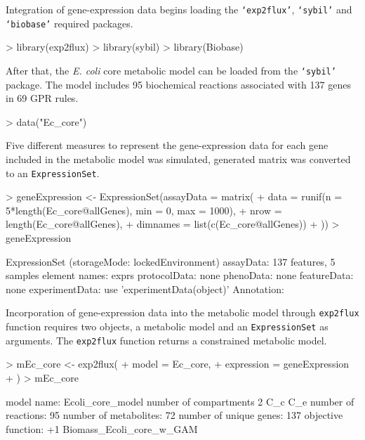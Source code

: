 Integration of gene-expression data begins loading the \texttt{`exp2flux'}, \texttt{`sybil'} and \texttt{`biobase'} required packages.
\begin{Schunk}
\begin{Sinput}
> library(exp2flux)
> library(sybil)
> library(Biobase)
\end{Sinput}
\end{Schunk}
After that, the \textit{E. coli} core metabolic model can be loaded from the \texttt{`sybil'} package. The model includes 95 biochemical reactions associated with 137 genes in 69 GPR rules.
\begin{Schunk}
\begin{Sinput}
> data("Ec_core")
\end{Sinput}
\end{Schunk}
Five different measures to represent the gene-expression data for each gene included in the metabolic model was simulated, generated matrix was converted to an \texttt{ExpressionSet}.
\begin{Schunk}
\begin{Sinput}
> geneExpression <- ExpressionSet(assayData = matrix(
+   data = runif(n = 5*length(Ec_core@allGenes), min = 0, max = 1000),
+   nrow = length(Ec_core@allGenes),
+   dimnames = list(c(Ec_core@allGenes))
+   ))
> geneExpression
\end{Sinput}
\begin{Soutput}
ExpressionSet (storageMode: lockedEnvironment)
assayData: 137 features, 5 samples 
  element names: exprs 
protocolData: none
phenoData: none
featureData: none
experimentData: use 'experimentData(object)'
Annotation:  
\end{Soutput}
\end{Schunk}
Incorporation of gene-expression data into the metabolic model through \texttt{exp2flux} function requires two objects, a metabolic model and an \texttt{ExpressionSet} as arguments. The \texttt{exp2flux} function returns a constrained metabolic model. 
\begin{Schunk}
\begin{Sinput}
> mEc_core <- exp2flux(
+   model = Ec_core,
+   expression = geneExpression
+   )
> mEc_core
\end{Sinput}
\begin{Soutput}
model name:             Ecoli_core_model 
number of compartments  2 
                        C_c 
                        C_e 
number of reactions:    95 
number of metabolites:  72 
number of unique genes: 137 
objective function:     +1 Biomass_Ecoli_core_w_GAM 
\end{Soutput}
\end{Schunk}
